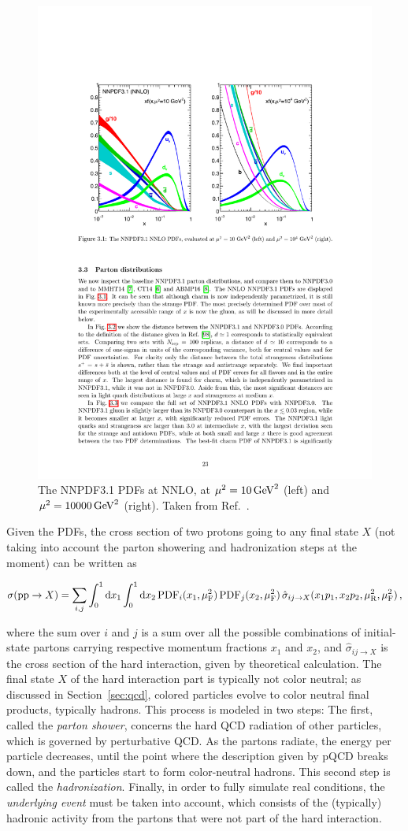 \begin{figure}[hbtp]
  \begin{center}
    \includegraphics[width=0.6\linewidth]{img/theory/nnpdf31.pdf}
    \caption{
        The NNPDF3.1 PDFs at NNLO, at $\mu^2=10\,\text{GeV}^2$ (left) and $\mu^2=10000\,\text{GeV}^2$ (right).
        Taken from Ref.~\cite{Ball:2017nwa}.
        }
    \label{fig:nnpdf31}
  \end{center}
\end{figure}


Given the PDFs, the cross section of two protons going to any final state $X$ (not taking into account the parton showering and hadronization steps at the moment) can be written as
% 
\begin{linenomath*}
\begin{equation}
\sigma(\mathrm{p}\mathrm{p}\to X)
= \sum_{i,j} \int_0^1 \textrm{d}x_1 \int_0^1 \textrm{d}x_2
    \, \text{PDF}_i(x_1,\mu_\mathrm{F}^2) \, \text{PDF}_j(x_2,\mu_\mathrm{F}^2)
    \, \hat{\sigma}_{ij\to X}(x_1 p_1, x_2 p_2, \mu_\mathrm{R}^2, \mu_\mathrm{F}^2)
\,,
\end{equation}
\end{linenomath*}
% 
where the sum over $i$ and $j$ is a sum over all the possible combinations of initial-state partons carrying respective momentum fractions $x_1$ and $x_2$, and $\hat{\sigma}_{ij\to X}$ is the cross section of the hard interaction, given by theoretical calculation.
% 
The final state $X$ of the hard interaction part is typically not color neutral; as discussed in Section~\ref{sec:qcd}, colored particles evolve to color neutral final products, typically hadrons.
% 
This process is modeled in two steps: The first, called the \textit{parton shower}, concerns the hard QCD radiation of other particles, which is governed by perturbative QCD.
% 
As the partons radiate, the energy per particle decreases, until the point where the description given by pQCD breaks down, and the particles start to form color-neutral hadrons.
% 
This second step is called the \textit{hadronization}.
% 
Finally, in order to fully simulate real conditions, the \textit{underlying event} must be taken into account, which consists of the (typically) hadronic activity from the partons that were not part of the hard interaction.


